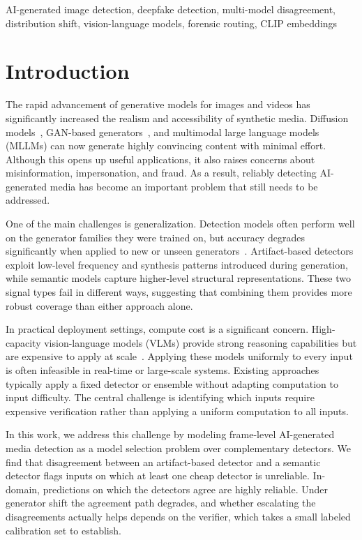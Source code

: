 \documentclass{ieeeaccess}
\begin{document}
\begin{keywords}
AI-generated image detection, deepfake 
detection, multi-model disagreement, distribution shift, 
vision-language models, forensic routing, CLIP embeddings
\end{keywords}

\titlepgskip=-21pt
\maketitle

\section{Introduction}

The rapid advancement of generative models for images and videos has significantly increased the realism and accessibility of synthetic media. Diffusion models~\cite{Wang_2023_ICCV}, GAN-based generators~\cite{wang2020cnn}, and multimodal large language models (MLLMs) can now generate highly convincing content with minimal effort. Although this opens up useful applications, it also raises concerns about misinformation, impersonation, and fraud. As a result, reliably detecting AI-generated media has become an important problem that still needs to be addressed.

One of the main challenges is generalization. Detection models often perform well on the generator families they were trained on, but accuracy degrades significantly when applied to new or unseen generators~\cite{NEURIPS2023_f4d4a021}. Artifact-based detectors exploit low-level frequency and synthesis patterns introduced during generation, while semantic models capture higher-level structural representations. These two signal types fail in different ways, suggesting that combining them provides more robust coverage than either approach alone.

In practical deployment settings, compute cost is a significant concern. High-capacity
vision-language models (VLMs) provide strong reasoning capabilities but are expensive to apply at scale~\cite{chen2024frugalgpt}. Applying these models uniformly to every input is often infeasible in real-time or large-scale systems. Existing approaches typically apply a
fixed detector or ensemble without adapting computation to input difficulty. The central challenge is identifying which inputs require expensive verification rather than applying a
uniform computation to all inputs.

In this work, we address this challenge by modeling frame-level AI-generated media detection as a model selection problem over complementary detectors. We find that disagreement between an artifact-based detector and a semantic detector flags inputs on which at least one cheap detector is unreliable. In-domain, predictions on which the detectors agree are highly reliable. Under generator shift the agreement path degrades, and whether escalating the disagreements actually helps depends on the verifier, which takes a small labeled calibration set to establish.
\end{document}
